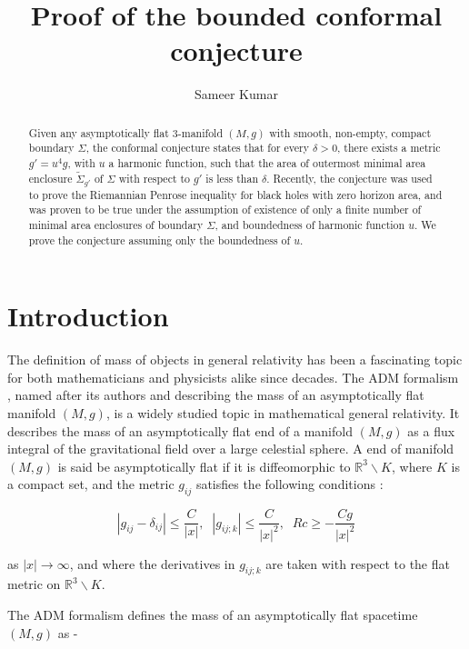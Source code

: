 \documentclass{amsart}
\title{Proof of the bounded conformal conjecture}
\author{Sameer Kumar}
\date{}
\newcommand{\ts}{\tilde{\Sigma}}
\theoremstyle{named}
\begin{document}
\begin{abstract}
    Given any asymptotically flat 3-manifold $(M,g)$ with smooth, non-empty, compact boundary $\Sigma$, the conformal conjecture states that for every $\delta>0$, there exists a metric $g' = u^4 g$, with $u$ a harmonic function, such that the area of outermost minimal area enclosure $\ts_{g'}$ of $\Sigma$ with respect to $g'$ is less than $\delta$. Recently, the conjecture was used to prove the Riemannian Penrose inequality for black holes with zero horizon area, and was proven to be true under the assumption of existence of only a finite number of minimal area enclosures of boundary $\Sigma$, and boundedness of harmonic function $u$. We prove the conjecture assuming only the boundedness of $u$.
\end{abstract}

\maketitle

\section{Introduction}

The definition of mass of objects in general relativity has been a fascinating topic for both mathematicians and physicists alike since decades. The ADM formalism \cite{adm}, named after its authors and describing the mass of an asymptotically flat manifold $(M,g)$,  is a widely studied topic in mathematical general relativity. It describes the mass of an asymptotically flat end of a manifold $(M,g)$ as a flux integral of the gravitational field over a large celestial sphere. A end of manifold $(M,g)$ is said be asymptotically flat if it is diffeomorphic to $\mathbb{R}^3 \backslash K$, where $K$ is a compact set, and the metric $g_{ij}$ satisfies the following conditions \cite{huiskenilmanen}: 

\begin{equation*}
    |g_{ij} - \delta_{ij}| \leq \frac{C}{|x|}, \;\; |g_{ij;k}| \leq \frac{C}{|x|^2}, \;\; Rc \geq - \frac{Cg}{|x|^2}
\end{equation*}

as $|x| \rightarrow \infty$, and where the derivatives in $g_{ij;k}$ are taken with respect to the flat metric on $\mathbb{R}^3 \backslash K$.

The ADM formalism defines the mass of an asymptotically flat spacetime $(M,g)$ as -
\end{document}
